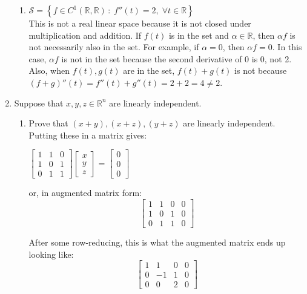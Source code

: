 \documentclass[11pt]{amsart}
\theoremstyle{plain}
\theoremstyle{definition}
\begin{document}
\begin{enumerate}
\begin{enumerate}
\item $\mathcal{S}=\left\{ f\in C^{1}(\mathbb{R},\mathbb{R})\,:\;f''(t)=2,\;\forall t\in\mathbb{R}\right\}$ \\
This is not a real linear space because it is not closed under multiplication and addition. If $f(t)$ is in the set and $\alpha \in \mathbb{R}$, then $\alpha f$ is not necessarily also in the set. For example, if $\alpha = 0$, then $\alpha f = 0$. In this case, $\alpha f$ is not in the set because the second derivative of 0 is 0, not 2. Also, when $f(t), g(t)$ are in the set, $f(t) + g(t)$ is not because $(f + g)''(t) = f''(t) + g''(t) = 2 + 2 = 4 \neq 2$.
\end{enumerate}

\bigskip 

\item Suppose that $x, y, z \in \mathbb{R}^n$ are linearly independent. 
\begin{enumerate} 
\item Prove that $(x+y), (x+z), (y+z)$ are linearly independent. \\
Putting these in a matrix gives:

\begin{center}
$
\begin{bmatrix}
	1 & 1 & 0 \\
	1 & 0 & 1 \\
	0 & 1 & 1
\end{bmatrix}
\begin{bmatrix}
	x \\
	y \\
	z
\end{bmatrix}
=
\begin{bmatrix}
	0  \\
	0  \\
 	0
\end{bmatrix}
$
\end{center}

or, in augmented matrix form:
$$
\left[\begin{array}{rrr|r}
1 & 1 & 0 & 0 \\
1 & 0 & 1 & 0 \\
0 & 1 & 1 & 0
\end{array}\right]
$$ 

After some row-reducing, this is what the augmented matrix ends up looking like:
$$
\left[\begin{array}{rrr|r}
1 & 1 & 0 & 0 \\
0 & -1 & 1 & 0 \\
0 & 0 & 2 & 0
\end{array}\right]
$$ 


\end{enumerate}
\end{enumerate}
\end{document}
